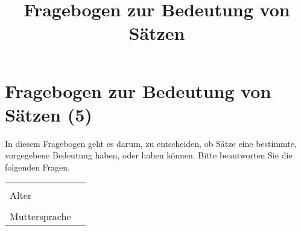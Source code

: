 \documentclass[a4paper, 8pt]{article}
\title{Fragebogen zur Bedeutung von Sätzen}
\begin{document}
\section*{Fragebogen zur Bedeutung von Sätzen (5)}

In diesem Fragebogen geht es darum, zu entscheiden, ob Sätze eine bestimmte, vorgegebene Bedeutung haben, oder haben können. Bitte beantworten Sie die folgenden Fragen.


\begin{tabular}{|l|p{5cm}|}
\hline
& \\
Alter & \\
\hline
& \\
Muttersprache & \\
\hline
\end{tabular}
\end{document}
